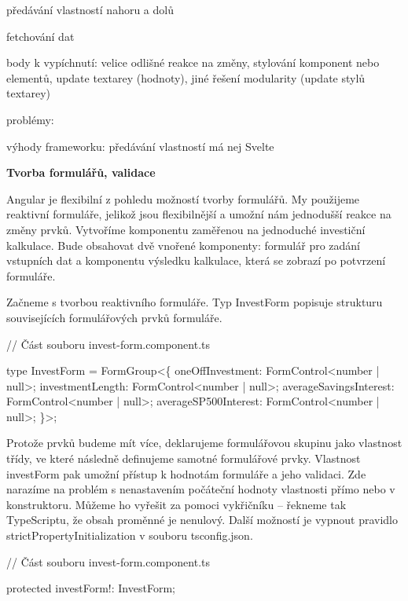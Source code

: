 \begin{citemize}
	\item předávání vlastností nahoru a dolů
	\item fetchování dat
	\item body k vypíchnutí: velice odlišné reakce na změny, stylování komponent nebo elementů, update textarey (hodnoty), jiné řešení modularity (update stylů textarey)
	\item problémy:
	\item výhody frameworku: předávání vlastností má nej Svelte
\end{citemize}

\begin{flushleft}
  \textbf{Tvorba formulářů, validace}
\end{flushleft}

Angular je flexibilní z pohledu možností tvorby formulářů. My použijeme reaktivní formuláře, jelikož jsou flexibilnější a umožní nám jednodušší reakce na změny prvků.
Vytvoříme komponentu zaměřenou na jednoduché investiční kalkulace. 
Bude obsahovat dvě vnořené komponenty: formulář pro zadání vstupních dat a komponentu výsledku kalkulace, která se zobrazí po potvrzení formuláře.

Začneme s tvorbou reaktivního formuláře. Typ InvestForm popisuje strukturu souvisejících formulářových prvků formuláře.

\begin{prog}
// Část souboru invest-form.component.ts

type InvestForm = FormGroup<\{
  oneOffInvestment: FormControl<number | null>;
  investmentLength: FormControl<number | null>;
  averageSavingsInterest: FormControl<number | null>;
  averageSP500Interest: FormControl<number | null>;
\}>;
\end{prog}

Protože prvků budeme mít více, deklarujeme formulářovou skupinu jako vlastnost třídy, ve které následně definujeme samotné formulářové prvky. 
Vlastnost investForm pak umožní přístup k hodnotám formuláře a jeho validaci. Zde narazíme na problém s nenastavením počáteční hodnoty vlastnosti přímo nebo v konstruktoru. 
Můžeme ho vyřešit za pomoci vykřičníku -- řekneme tak TypeScriptu, že obsah proměnné je nenulový. Další možností je vypnout pravidlo strictPropertyInitialization v souboru tsconfig.json.

\begin{prog}
// Část souboru invest-form.component.ts

protected investForm!: InvestForm;
\end{prog}

